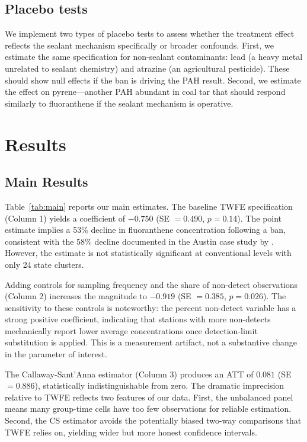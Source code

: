 \documentclass[12pt]{article}
\begin{document}
\subsection{Placebo tests}

We implement two types of placebo tests to assess whether the treatment effect reflects the sealant mechanism specifically or broader confounds. First, we estimate the same specification for non-sealant contaminants: lead (a heavy metal unrelated to sealant chemistry) and atrazine (an agricultural pesticide). These should show null effects if the ban is driving the PAH result. Second, we estimate the effect on pyrene---another PAH abundant in coal tar that should respond similarly to fluoranthene if the sealant mechanism is operative.

\section{Results}

\subsection{Main Results}



Table~\ref{tab:main} reports our main estimates. The baseline TWFE specification (Column 1) yields a coefficient of $-0.750$ (SE $= 0.490$, $p = 0.14$). The point estimate implies a 53\% decline in fluoranthene concentration following a ban, consistent with the 58\% decline documented in the Austin case study by \citet{vanmetre2014decline}. However, the estimate is not statistically significant at conventional levels with only 24 state clusters.

Adding controls for sampling frequency and the share of non-detect observations (Column 2) increases the magnitude to $-0.919$ (SE $= 0.385$, $p = 0.026$). The sensitivity to these controls is noteworthy: the percent non-detect variable has a strong positive coefficient, indicating that stations with more non-detects mechanically report lower average concentrations once detection-limit substitution is applied. This is a measurement artifact, not a substantive change in the parameter of interest.

The Callaway-Sant'Anna estimator (Column 3) produces an ATT of $0.081$ (SE $= 0.886$), statistically indistinguishable from zero. The dramatic imprecision relative to TWFE reflects two features of our data. First, the unbalanced panel means many group-time cells have too few observations for reliable estimation. Second, the CS estimator avoids the potentially biased two-way comparisons that TWFE relies on, yielding wider but more honest confidence intervals.
\end{document}
